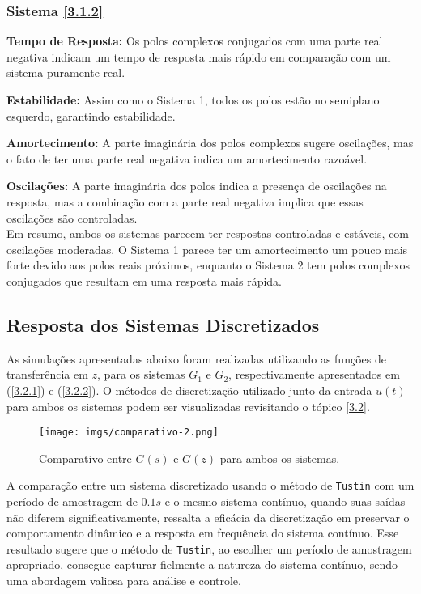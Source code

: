 \documentclass[a4paper,12pt]{article}
\begin{document}
\subsubsection{Sistema \ref{3.1.2}}\label{4.4.1.2}

\textbf{Tempo de Resposta:} Os polos complexos conjugados com uma parte real negativa indicam um tempo de resposta mais rápido em comparação com um sistema puramente real.

\textbf{Estabilidade:} Assim como o Sistema 1, todos os polos estão no semiplano esquerdo, garantindo estabilidade.

\textbf{Amortecimento:} A parte imaginária dos polos complexos sugere oscilações, mas o fato de ter uma parte real negativa indica um amortecimento razoável.

\textbf{Oscilações:} A parte imaginária dos polos indica a presença de oscilações na resposta, mas a combinação com a parte real negativa implica que essas oscilações são controladas.\\

\noindent Em resumo, ambos os sistemas parecem ter respostas controladas e estáveis, com oscilações moderadas. O Sistema 1 parece ter um amortecimento um pouco mais forte devido aos polos reais próximos, enquanto o Sistema 2 tem polos complexos conjugados que resultam em uma resposta mais rápida.

\subsection{Resposta dos Sistemas Discretizados}\label{4.2}

As simulações apresentadas abaixo foram realizadas utilizando as funções de transferência em $z$, para os sistemas $G_1$ e $G_2$, respectivamente apresentados em (\ref{3.2.1}) e (\ref{3.2.2}). O métodos de discretização utilizado junto da entrada $u(t)$ para ambos os sistemas podem ser visualizadas revisitando o tópico \ref{3.2}.

\begin{figure}[h!]\label{fig3}
  \centering
  \texttt{[image: imgs/comparativo-2.png]}
  \caption{Comparativo entre $G(s)$ e $G(z)$ para ambos os sistemas.}
\end{figure}

A comparação entre um sistema discretizado usando o método de \texttt{Tustin} com um período de amostragem de $0.1s$ e o mesmo sistema contínuo, quando suas saídas não diferem significativamente, ressalta a eficácia da discretização em preservar o comportamento dinâmico e a resposta em frequência do sistema contínuo. Esse resultado sugere que o método de \texttt{Tustin}, ao escolher um período de amostragem apropriado, consegue capturar fielmente a natureza do sistema contínuo, sendo uma abordagem valiosa para análise e controle.
\end{document}
